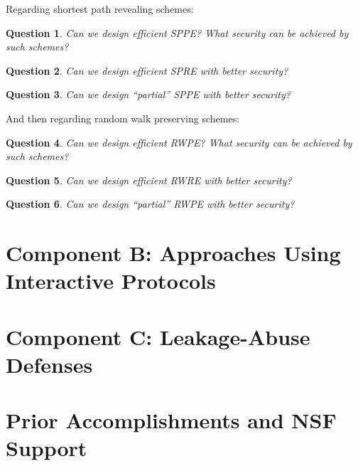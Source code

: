 \documentclass[11pt]{article}
\newtheorem{question}{Question}[section]
\theoremstyle{remark}
\begin{document}
Regarding shortest path revealing schemes: 

\begin{question}
Can we design efficient SPPE?  What security can be achieved by such schemes?
\end{question}


\begin{question}
Can we design efficient SPRE with better security?
\end{question}

\begin{question}
Can we design ``partial'' SPPE with better security?
\end{question}

And then regarding random walk preserving schemes:

\begin{question}
Can we design efficient RWPE?  What security can be achieved by such schemes?
\end{question}


\begin{question}
Can we design efficient RWRE with better security?
\end{question}

\begin{question}
Can we design ``partial'' RWPE with better security?
\end{question}


%

\section{Component B: Approaches Using Interactive Protocols}




\section{Component C: Leakage-Abuse Defenses}


\section{Prior Accomplishments and NSF Support}
\end{document}
